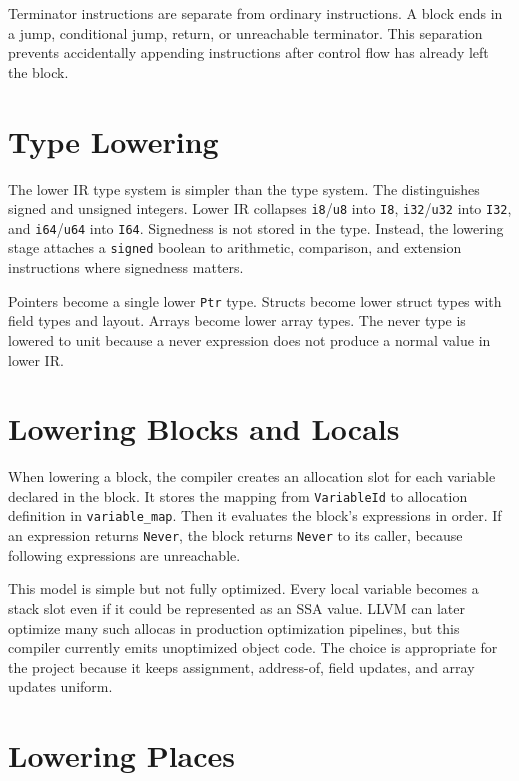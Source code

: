 Terminator instructions are separate from ordinary instructions. A block ends in
a jump, conditional jump, return, or unreachable terminator. This separation
prevents accidentally appending instructions after control flow has already left
the block.

\section{Type Lowering}

The lower IR type system is simpler than the \irtree{} type system. The
\irtree{} distinguishes signed and unsigned integers. Lower IR collapses
\texttt{i8}/\texttt{u8} into \texttt{I8}, \texttt{i32}/\texttt{u32} into
\texttt{I32}, and \texttt{i64}/\texttt{u64} into \texttt{I64}. Signedness is not
stored in the type. Instead, the lowering stage attaches a \texttt{signed}
boolean to arithmetic, comparison, and extension instructions where signedness
matters.

Pointers become a single lower \texttt{Ptr} type. Structs become lower struct
types with field types and layout. Arrays become lower array types. The never
type is lowered to unit because a never expression does not produce a normal
value in lower IR.

\section{Lowering Blocks and Locals}

When lowering a \irtree{} block, the compiler creates an allocation slot for
each variable declared in the block. It stores the mapping from \texttt{VariableId}
to allocation definition in \texttt{variable\_map}. Then it evaluates the block's
expressions in order. If an expression returns \texttt{Never}, the block returns
\texttt{Never} to its caller, because following expressions are unreachable.

This model is simple but not fully optimized. Every local variable becomes a
stack slot even if it could be represented as an SSA value. LLVM can later
optimize many such allocas in production optimization pipelines, but this
compiler currently emits unoptimized object code. The choice is appropriate for
the project because it keeps assignment, address-of, field updates, and array
updates uniform.

\section{Lowering Places}

